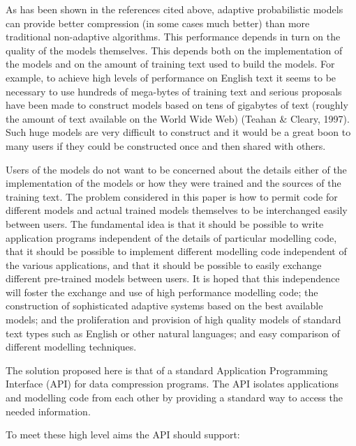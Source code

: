 \documentclass[11pt]{article}
\begin{document}
As has been shown in the references cited above, adaptive probabilistic
models can provide better compression (in some cases much better) than more
traditional non-adaptive algorithms. This performance depends in turn on the
quality of the models themselves. This depends both on the implementation of
the models and on the amount of training text used to build the models. For
example, to achieve high levels of performance on English text it seems to
be necessary to use hundreds of mega-bytes of training text and serious
proposals have been made to construct models based on tens of gigabytes of
text (roughly the amount of text available on the World Wide Web) (Teahan \&
Cleary, 1997). Such huge models are very difficult to construct and it would
be a great boon to many users if they could be constructed once and
then shared with others.

Users of the models do not want to be concerned about the details either of
the implementation of the models or how they were trained and the sources of
the training text. The problem considered in this paper is how to permit
code for different models and actual trained models themselves to be
interchanged easily between users. The fundamental idea is that it should be
possible to write application programs independent of the details of
particular modelling code, that it should be possible to implement different
modelling code independent of the various applications, and that it should be
possible to easily exchange different pre-trained models between users. It
is hoped that this independence will foster the exchange and use of high
performance modelling code; the construction of sophisticated adaptive
systems based on the best available models; and the proliferation and
provision of high quality models of standard text types such as English or
other natural languages; and easy comparison of different modelling
techniques.

The solution proposed here is that of a standard Application Programming
Interface (API) for data compression programs. The API isolates applications
and modelling code from each other by providing a standard way to access the
needed information.

To meet these high level aims the API should support:
\end{document}

